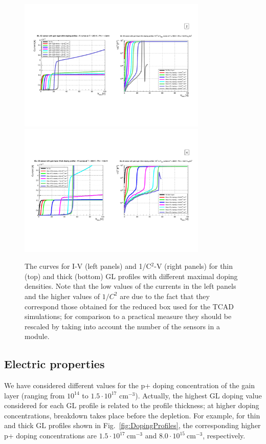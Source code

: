 \documentclass[aps,pt14,superscriptaddress,showpacs,floatfix,nofootinbib]{revtex4}
\begin{document}
\begin{figure}[h!]
\begin{center}
\includegraphics[width=0.80\textwidth,keepaspectratio]{figures1/Thin_IV_CV_curves.pdf}
\includegraphics[width=0.80\textwidth,keepaspectratio]{figures1/Thick_IV_CV_curves.pdf}
\end{center}
\caption{The curves for I-V (left panels) and 1/C$^2$-V (right panels) for  thin (top) and thick (bottom) GL profiles  with different maximal doping densities. Note that the low values of the currents in the left panels and the higher values of $1/C^2$ are due to the fact that they correspond those obtained for the reduced box used for the TCAD simulations; for comparison to a practical measure they should be rescaled by taking into account the number of the sensors in a module.
\label{fig:IV-CV}}
\end{figure}

\subsection{Electric properties}    
We have considered different values for the p+ doping concentration of the gain layer (ranging from $10^{14}$ to $1.5\cdot 10^{17}$ cm$^{-3}$). Actually, the highest GL doping value considered for each GL profile is related to the profile thickness; at higher doping concentrations, breakdown takes place before the depletion. For example, for thin and thick GL profiles shown in Fig.~\ref{fig:DopingProfiles}, the corresponding higher p+ doping  concentrations are $1.5\cdot 10^{17}\ \mathrm{cm^{-3}}$ and $8.0\cdot 10^{15}\ \mathrm{cm^{-3}}$, respectively. 
\end{document}
